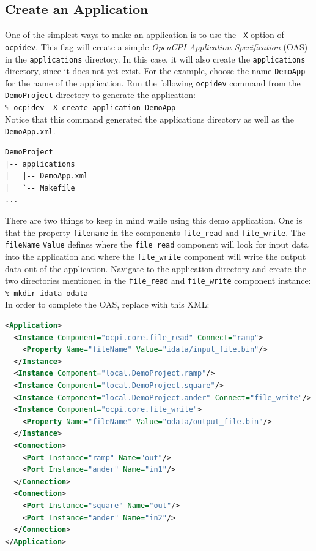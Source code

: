 \subsection{Create an Application}
One of the simplest ways to make an application is to use the \verb+-X+ option of \verb+ocpidev+. This flag will create a simple \textit{OpenCPI Application Specification} (OAS) in the \verb+applications+ directory. In this case, it will also create the \verb+applications+ directory, since it does not yet exist. For the example, choose the name \verb+DemoApp+ for the name of the application. Run the following \verb+ocpidev+ command from the \verb+DemoProject+ directory to generate the application:\\

\forceindent\verb+% ocpidev -X create application DemoApp+\\

Notice that this command generated the applications directory as well as the \verb+DemoApp.xml+.

\begin{verbatim}
DemoProject
|-- applications
|   |-- DemoApp.xml
|   `-- Makefile
...
\end{verbatim}

There are two things to keep in mind while using this demo application. One is that the property \verb+filename+ in the components \verb+file_read+ and \verb+file_write+. The \verb+fileName+ \verb+Value+ defines where the \verb+file_read+ component will look for input data into the application and where the \verb+file_write+ component will write the output data out of the application. \newline
\bstart
Navigate to the application directory and create the two directories mentioned in the \verb+file_read+ and \verb+file_write+ component instance:\\

\forceindent\verb+% mkdir idata odata+\\
\bend
\bstart
In order to complete the OAS, replace  with this XML:
\begin{lstlisting}[language=xml]
<Application>
  <Instance Component="ocpi.core.file_read" Connect="ramp">
    <Property Name="fileName" Value="idata/input_file.bin"/>
  </Instance>
  <Instance Component="local.DemoProject.ramp"/>
  <Instance Component="local.DemoProject.square"/>
  <Instance Component="local.DemoProject.ander" Connect="file_write"/>
  <Instance Component="ocpi.core.file_write">
    <Property Name="fileName" Value="odata/output_file.bin"/>
  </Instance>
  <Connection>
    <Port Instance="ramp" Name="out"/>
    <Port Instance="ander" Name="in1"/>
  </Connection>
  <Connection>
    <Port Instance="square" Name="out"/>
    <Port Instance="ander" Name="in2"/>
  </Connection>
</Application>
\end{lstlisting}
\bend

